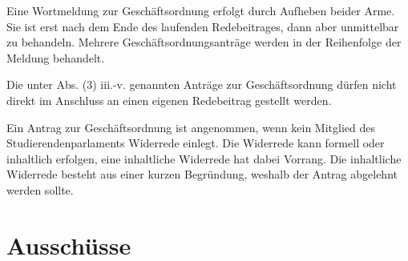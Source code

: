 \documentclass[10pt,a4paper]{scrartcl}
\begin{document}
\begin{contract}
Eine Wortmeldung zur Geschäftsordnung erfolgt durch Aufheben
beider Arme. Sie ist erst nach dem Ende des laufenden Redebeitrages,
dann aber unmittelbar zu behandeln. Mehrere Geschäftsordnungsanträge
werden in der Reihenfolge der Meldung behandelt. 

Die unter Abs. (3) iii.-v. genannten Anträge zur Geschäftsordnung dürfen nicht
direkt im Anschluss an einen eigenen Redebeitrag gestellt werden.

Ein Antrag zur Geschäftsordnung ist angenommen, wenn kein Mitglied des
Studierendenparlaments Widerrede einlegt. Die Widerrede kann formell oder
inhaltlich erfolgen, eine inhaltliche Widerrede hat dabei Vorrang. Die
inhaltliche Widerrede besteht aus einer kurzen Begründung, weshalb der Antrag
abgelehnt werden sollte.

\end{contract}


\section{Ausschüsse}\label{ausschuxfcsse}
\end{document}
